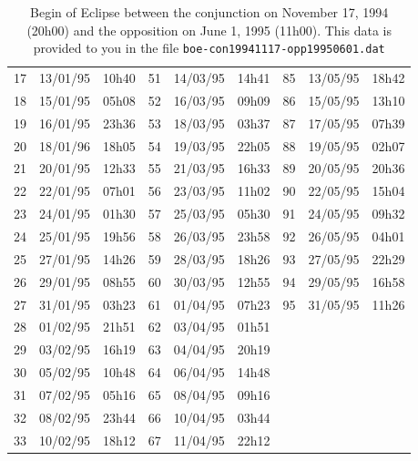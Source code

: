 \documentclass{tufte-handout}
\begin{document}
\begin{table}
\begin{tabular}{lll|lll|lll}
17 & 13/01/95 & 10h40 & 51 & 14/03/95 & 14h41 & 85 & 13/05/95 & 18h42 \\
18 & 15/01/95 & 05h08 & 52 & 16/03/95 & 09h09 & 86 & 15/05/95 & 13h10 \\
19 & 16/01/95 & 23h36 & 53 & 18/03/95 & 03h37 & 87 & 17/05/95 & 07h39 \\
20 & 18/01/96 & 18h05 & 54 & 19/03/95 & 22h05 & 88 & 19/05/95 & 02h07 \\
21 & 20/01/95 & 12h33 & 55 & 21/03/95 & 16h33 & 89 & 20/05/95 & 20h36 \\
22 & 22/01/95 & 07h01 & 56 & 23/03/95 & 11h02 & 90 & 22/05/95 & 15h04 \\
23 & 24/01/95 & 01h30 & 57 & 25/03/95 & 05h30 & 91 & 24/05/95 & 09h32 \\
24 & 25/01/95 & 19h56 & 58 & 26/03/95 & 23h58 & 92 & 26/05/95 & 04h01 \\
25 & 27/01/95 & 14h26 & 59 & 28/03/95 & 18h26 & 93 & 27/05/95 & 22h29 \\
26 & 29/01/95 & 08h55 & 60 & 30/03/95 & 12h55 & 94 & 29/05/95 & 16h58 \\
27 & 31/01/95 & 03h23 & 61 & 01/04/95 & 07h23 & 95 & 31/05/95 & 11h26 \\
28 & 01/02/95 & 21h51 & 62 & 03/04/95 & 01h51 &  & & \\
29 & 03/02/95 & 16h19 & 63 & 04/04/95 & 20h19 &  & & \\
30 & 05/02/95 & 10h48 & 64 & 06/04/95 & 14h48 &  & & \\
31 & 07/02/95 & 05h16 & 65 & 08/04/95 & 09h16 &  & & \\
32 & 08/02/95 & 23h44 & 66 & 10/04/95 & 03h44 &  & & \\
33 & 10/02/95 & 18h12 & 67 & 11/04/95 & 22h12 &  & & \\
\end{tabular}
\caption{ Begin of Eclipse between the conjunction on November 17, 1994 (20h00) and the opposition on June 1, 1995 (11h00). This data is provided to you in the file {\tt boe-con19941117-opp19950601.dat}}
\end{table}
\end{document}
